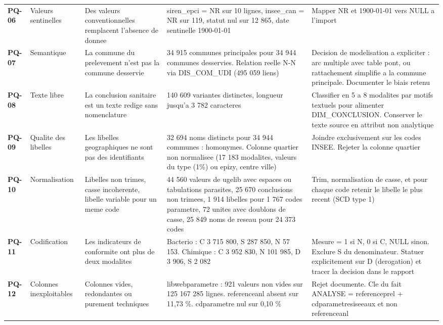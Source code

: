 {\begin{longtable}{@{}p{1.1cm}p{2.2cm}p{4.2cm}p{3.6cm}p{4.3cm}@{}}
\textbf{PQ-06} & Valeurs sentinelles & Des valeurs conventionnelles remplacent l'absence de donnee & siren\_epci = NR sur 10 lignes, insee\_can = NR sur 119, statut nul sur 12 865, date sentinelle 1900-01-01 & Mapper NR et 1900-01-01 vers NULL a l'import \\[2pt]
\textbf{PQ-07} & Semantique & La commune du prelevement n'est pas la commune desservie & 34 915 communes principales pour 34 944 communes desservies. Relation reelle N-N via DIS\_COM\_UDI (495 059 liens) & Decision de modelisation a expliciter : arc multiple avec table pont, ou rattachement simplifie a la commune principale. Documenter le biais retenu \\[2pt]
\textbf{PQ-08} & Texte libre & La conclusion sanitaire est un texte redige sans nomenclature & 140 609 variantes distinctes, longueur jusqu'a 3 782 caracteres & Classifier en 5 a 8 modalites par motifs textuels pour alimenter DIM\_CONCLUSION. Conserver le texte source en attribut non analytique \\[2pt]
\textbf{PQ-09} & Qualite des libelles & Les libelles geographiques ne sont pas des identifiants & 32 694 noms distincts pour 34 944 communes : homonymes. Colonne quartier non normalisee (17 183 modalites, valeurs du type (1\%) ou epizy, centre ville) & Joindre exclusivement sur les codes INSEE. Rejeter la colonne quartier \\[2pt]
\textbf{PQ-10} & Normalisation & Libelles non trimes, casse incoherente, libelle variable pour un meme code & 44 560 valeurs de ugelib avec espaces ou tabulations parasites, 25 670 conclusions non trimees, 1 914 libelles pour 1 767 codes parametre, 72 unites avec doublons de casse, 25 849 noms de reseau pour 24 373 codes & Trim, normalisation de casse, et pour chaque code retenir le libelle le plus recent (SCD type 1) \\[2pt]
\textbf{PQ-11} & Codification & Les indicateurs de conformite ont plus de deux modalites & Bacterio : C 3 715 800, S 287 850, N 57 153. Chimique : C 3 952 830, N 101 985, D 3 906, S 2 082 & Mesure = 1 si N, 0 si C, NULL sinon. Exclure S du denominateur. Statuer explicitement sur D (derogation) et tracer la decision dans le rapport \\[2pt]
\textbf{PQ-12} & Colonnes inexploitables & Colonnes vides, redondantes ou purement techniques & libwebparametre : 921 valeurs non vides sur 125 167 285 lignes. referenceanl absent sur 11,73 \%. cdparametre nul sur 0,10 \% & Rejet documente. Cle du fait ANALYSE = referenceprel + cdparametresiseeaux et non referenceanl \\[2pt]

\end{longtable}}
